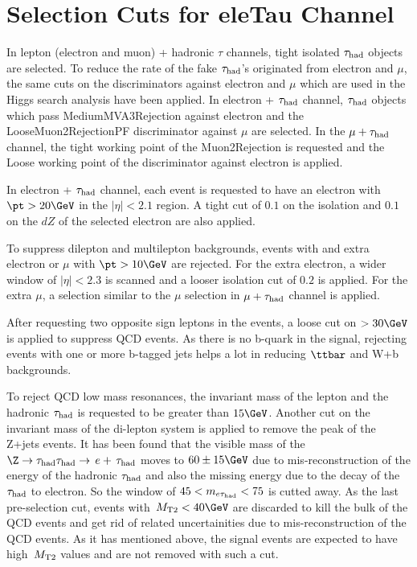 \section{Selection Cuts for eleTau Channel}
\label{sect:eleTauCuts}
In lepton (electron and muon) + hadronic $\tau$ channels, tight isolated $\tau_{\rm had}$ objects are selected. To reduce the rate of the fake $\tau_{\rm had}$'s originated from electron and $\mu$, the same cuts on the discriminators against electron and $\mu$ which are used in the Higgs search analysis have been applied. In electron + $\tau_{\rm had}$ channel, $\tau_{\rm had}$ objects which pass MediumMVA3Rejection against electron and the LooseMuon2RejectionPF discriminator against $\mu$ are selected. In the $\mu + \tau_{\rm had}$ channel, the tight working point of the Muon2Rejection is requested and the Loose working point of the discriminator against electron is applied.

 
In electron + $\tau_{\rm had}$ channel, each event is requested to have an electron with $\pt>20\GeV$ in the $|\eta| < 2.1 $ region. A tight cut of $0.1$ on the isolation and $0.1$ on the $dZ$ of the selected electron are also applied.

To suppress dilepton and multilepton backgrounds, events with and extra electron or $\mu$ with $\pt>10\GeV$ are rejected. For the extra electron, a wider window of $|\eta|<2.3$ is scanned and a looser isolation cut of $0.2$ is applied. For the extra $\mu$, a selection similar to the $\mu$ selection in $\mu+\tau_{\rm had}$ channel is applied.


After requesting two opposite sign leptons in the events, a loose cut on \MET $>30\GeV$ is applied to suppress QCD events. As there is no b-quark in the signal, rejecting events with one or more b-tagged jets helps a lot in reducing $\ttbar$ and W+b backgrounds.

To reject QCD low mass resonances, the invariant mass of the lepton and the hadronic $\tau_{\rm had}$ is requested to be greater than $15\GeV$. Another cut on the invariant mass of the di-lepton system is applied to remove the peak of the Z+jets events. It has been found that the visible mass of the $\Z\to\hadtau\hadtau\to\,e +\,\hadtau$ moves to $60 \pm 15\GeV$ due to mis-reconstruction of the energy of the hadronic $\tau_{\rm had}$ and also the missing energy due to the decay of the $\tau_{\rm had}$ to electron. So the window of $45 < m_{e\tau_{\rm had}} < 75$ is cutted away. As the last pre-selection cut, events with $\mttwo<40\GeV$ are discarded to kill the bulk of the QCD events and get rid of related uncertainities due to mis-reconstruction of the QCD events. As it has mentioned above, the signal events are expected to have high $\,{M_{\rm T2}}$ values and are not removed with such a cut.

